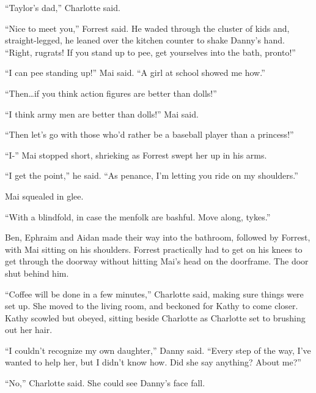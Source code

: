 ``Taylor's dad,'' Charlotte said.



``Nice to meet you,'' Forrest said.  He waded through the cluster of kids and, straight-legged, he leaned over the kitchen counter to shake Danny's hand.  ``Right, rugrats!  If you stand up to pee, get yourselves into the bath, pronto!''



``I can pee standing up!'' Mai said.  ``A girl at school showed me how.''



``Then\ldots if you think action figures are better than dolls!''



``I think army men are better than dolls!'' Mai said.



``Then let's go with those who'd rather be a baseball player than a princess!''



``I-''  Mai stopped short, shrieking as Forrest swept her up in his arms.



``I get the point,'' he said.  ``As penance, I'm letting you ride on my shoulders.''



Mai squealed in glee.



``With a blindfold, in case the menfolk are bashful.  Move along, tykes.''



Ben, Ephraim and Aidan made their way into the bathroom, followed by Forrest, with Mai sitting on his shoulders.  Forrest practically had to get on his knees to get through the doorway without hitting Mai's head on the doorframe.  The door shut behind him.



``Coffee will be done in a few minutes,'' Charlotte said, making sure things were set up.  She moved to the living room, and beckoned for Kathy to come closer.  Kathy scowled but obeyed, sitting beside Charlotte as Charlotte set to brushing out her hair.



``I couldn't recognize my own daughter,'' Danny said.  ``Every step of the way, I've wanted to help her, but I didn't know how.  Did she say anything?  About me?''



``No,'' Charlotte said.  She could see Danny's face fall.



